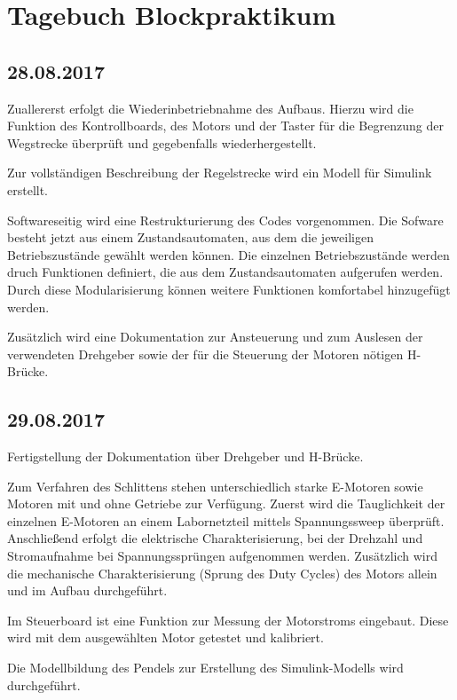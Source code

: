 \documentclass[fontsize=12pt,a4paper,parskip]{scrartcl}
\begin{document}
\let\raggedsection\centering
\section*{Tagebuch Blockpraktikum}
\let\raggedsection\raggedright

\subsection*{28.08.2017}

Zuallererst erfolgt die Wiederinbetriebnahme des Aufbaus. Hierzu wird die Funktion des Kontrollboards, des Motors und der Taster für die Begrenzung der Wegstrecke überprüft und gegebenfalls wiederhergestellt.

Zur vollständigen Beschreibung der Regelstrecke wird ein Modell für Simulink erstellt.

Softwareseitig wird eine Restrukturierung des Codes vorgenommen. Die Sofware besteht jetzt aus einem Zustandsautomaten, aus dem die jeweiligen Betriebszustände gewählt werden können. Die einzelnen Betriebszustände werden druch Funktionen definiert, die aus dem Zustandsautomaten aufgerufen werden. Durch diese Modularisierung können weitere Funktionen komfortabel hinzugefügt werden.

Zusätzlich wird eine Dokumentation zur Ansteuerung und zum Auslesen der verwendeten Drehgeber sowie der für die Steuerung der Motoren nötigen H-Brücke.


\subsection*{29.08.2017}

Fertigstellung der Dokumentation über Drehgeber und H-Brücke.

Zum Verfahren des Schlittens stehen unterschiedlich starke E-Motoren sowie Motoren mit und ohne Getriebe zur Verfügung. Zuerst wird die Tauglichkeit der einzelnen E-Motoren an einem Labornetzteil mittels Spannungssweep überprüft. Anschließend erfolgt die elektrische Charakterisierung, bei der Drehzahl und Stromaufnahme bei Spannungssprüngen aufgenommen werden. Zusätzlich wird die mechanische Charakterisierung (Sprung des Duty Cycles) des Motors allein und im Aufbau durchgeführt.

Im Steuerboard ist eine Funktion zur Messung der Motorstroms eingebaut. Diese wird mit dem ausgewählten Motor getestet und kalibriert.

Die Modellbildung des Pendels zur Erstellung des Simulink-Modells wird durchgeführt.
\end{document}
